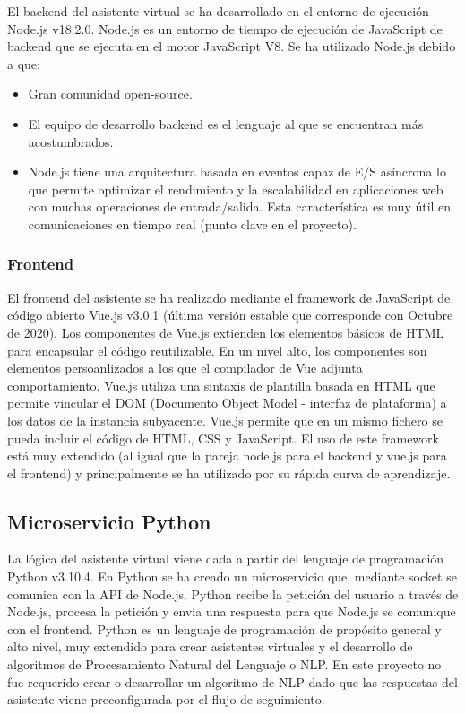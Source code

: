 El backend del asistente virtual se ha desarrollado en el entorno de ejecución Node.js v18.2.0. Node.js es un entorno de tiempo de ejecución de JavaScript de backend que se ejecuta en el motor JavaScript V8. Se ha utilizado Node.js debido a que:
\begin{itemize}
    \item Gran comunidad open-source.
    \item El equipo de desarrollo backend es el lenguaje al que se encuentran más acostumbrados.
    \item Node.js tiene una arquitectura basada en eventos capaz de E/S asíncrona lo que permite optimizar el rendimiento y la escalabilidad en aplicaciones web con muchas operaciones de entrada/salida. Esta característica es muy útil en comunicaciones en tiempo real (punto clave en el proyecto).
\end{itemize}


\subsubsection{Frontend}

El frontend del asistente se ha realizado mediante el framework de JavaScript de código abierto Vue.js v3.0.1 (última versión estable que corresponde con Octubre de 2020). Los componentes de Vue.js extienden los elementos básicos de HTML para encapsular el código reutilizable. En un nivel alto, los componentes son elementos persoanlizados a los que el compilador de Vue adjunta comportamiento. Vue.js utiliza una sintaxis de plantilla basada en HTML que permite vincular el DOM (Documento Object Model - interfaz de plataforma) a los datos de la instancia subyacente. Vue.js permite que en un mismo fichero se pueda incluir el código de HTML, CSS y JavaScript. El uso de este framework está muy extendido (al igual que la pareja node.js para el backend y vue.js para el frontend) y principalmente se ha utilizado por su rápida curva de aprendizaje.


\subsection{Microservicio Python}

La lógica del asistente virtual viene dada a partir del lenguaje de programación Python v3.10.4. En Python se ha creado un microservicio que, mediante socket se comunica con la API de Node.js. Python recibe la petición del usuario a través de Node.js, procesa la petición y envia una respuesta para que Node.js se comunique con el frontend. Python es un lenguaje de programación de propósito general y alto nivel, muy extendido para crear asistentes virtuales y el desarrollo de algoritmos de Procesamiento Natural del Lenguaje o NLP. En este proyecto no fue requerido crear o desarrollar un algoritmo de NLP dado que las respuestas del asistente viene preconfigurada por el flujo de seguimiento.


